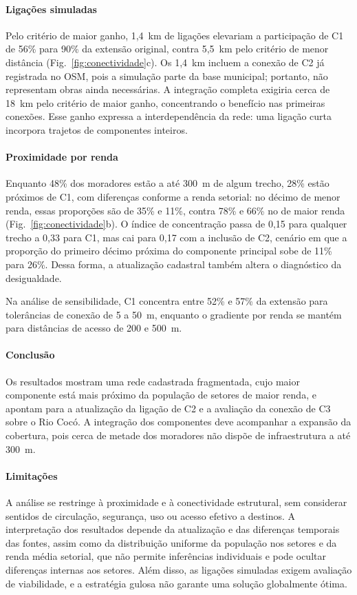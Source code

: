 \documentclass[10pt,a4paper,twocolumn]{article}
\begin{document}
\paragraph{Ligações simuladas} Pelo critério de maior ganho, 1,4~km de
ligações elevariam a participação de C1 de 56\% para 90\% da extensão
original, contra 5,5~km pelo critério de menor distância
(Fig.~\ref{fig:conectividade}c). Os 1,4~km incluem a conexão de C2 já
registrada no OSM, pois a simulação parte da base municipal; portanto,
não representam obras ainda necessárias. A integração completa exigiria
cerca de 18~km pelo critério de maior ganho, concentrando o benefício
nas primeiras conexões. Esse ganho expressa a interdependência da rede:
uma ligação curta incorpora trajetos de componentes inteiros.

\paragraph{Proximidade por renda} Enquanto 48\% dos moradores estão a
até 300~m de algum trecho, 28\% estão próximos de C1, com diferenças
conforme a renda setorial: no décimo de menor renda, essas proporções são
de 35\% e 11\%, contra 78\% e 66\% no de maior renda
(Fig.~\ref{fig:conectividade}b). O índice de concentração passa de 0,15
para qualquer trecho a 0,33 para C1, mas cai para 0,17 com a inclusão de
C2, cenário em que a proporção do primeiro décimo próxima do componente
principal sobe de 11\% para 26\%. Dessa forma, a atualização cadastral
também altera o diagnóstico da desigualdade.

Na análise de sensibilidade, C1 concentra entre 52\% e 57\% da extensão
para tolerâncias de conexão de 5 a 50~m, enquanto o gradiente por renda
se mantém para distâncias de acesso de 200 e 500~m.

\paragraph{Conclusão} Os resultados mostram uma rede cadastrada
fragmentada, cujo maior componente está mais próximo da população de
setores de maior renda, e apontam para a atualização da ligação de C2
e a avaliação da conexão de C3 sobre o Rio Cocó. A integração dos componentes deve
acompanhar a expansão da cobertura, pois cerca de metade dos moradores
não dispõe de infraestrutura a até 300~m.

\paragraph{Limitações} A análise se restringe à proximidade e à
conectividade estrutural, sem considerar sentidos de circulação, segurança,
uso ou acesso efetivo a destinos. A interpretação dos resultados depende
da atualização e das diferenças temporais das fontes, assim como da
distribuição uniforme da população nos setores e da renda média setorial,
que não permite inferências individuais e pode ocultar diferenças
internas aos setores. Além disso, as ligações simuladas
exigem avaliação de viabilidade, e a estratégia gulosa não garante uma
solução globalmente ótima.



\end{document}
